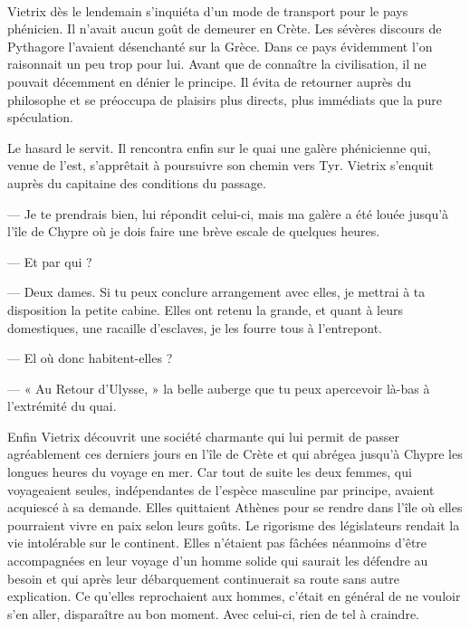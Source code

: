 \documentclass[a4paper, 11pt, oneside, polutonikogreek, french]{article}
\begin{document}
\paragraph{}
Vietrix dès le lendemain s'inquiéta d'un mode de transport pour le pays phénicien. Il n'avait aucun goût de demeurer en Crète. Les sévères discours de Pythagore l'avaient désenchanté sur la Grèce. Dans ce pays évidemment l'on raisonnait un peu trop pour lui. Avant que de connaître la civilisation, il ne pouvait décemment en dénier le principe. Il évita de retourner auprès du philosophe et se préoccupa de plaisirs plus directs, plus immédiats que la pure spéculation.

\bigskip
\centerline{\EightStarTaper}
\centerline{\EightStarTaper\EightStarTaper}
\bigskip

Le hasard le servit. Il rencontra enfin sur le quai une galère phénicienne qui, venue de l'est, s'apprêtait à poursuivre son chemin vers Tyr. Vietrix s'enquit auprès du capitaine des conditions du passage.

--- Je te prendrais bien, lui répondit celui-ci, mais ma galère a été louée jusqu'à l'île de Chypre où je dois faire une brève escale de quelques heures.

--- Et par qui ?

--- Deux dames. Si tu peux conclure arrangement avec elles, je mettrai à ta disposition la petite cabine. Elles ont retenu la grande, et quant à leurs domestiques, une racaille d'esclaves, je les fourre tous à l'entrepont.

--- El où donc habitent-elles ?

--- « Au Retour d'Ulysse, » la belle auberge que tu peux apercevoir là-bas à l'extrémité du quai.

Enfin Vietrix découvrit une société charmante qui lui permit de passer agréablement ces derniers jours en l'île de Crète et qui abrégea jusqu'à Chypre les longues heures du voyage en mer. Car tout de suite les deux femmes, qui voyageaient seules, indépendantes de l'espèce masculine par principe, avaient acquiescé à sa demande. Elles quittaient Athènes pour se rendre dans l'île où elles pourraient vivre en paix selon leurs goûts. Le rigorisme des législateurs rendait la vie intolérable sur le continent. Elles n'étaient pas fâchées néanmoins d'être accompagnées en leur voyage d'un homme solide qui saurait les défendre au besoin et qui après leur débarquement continuerait sa route sans autre explication. Ce qu'elles reprochaient aux hommes, c'était en général de ne vouloir s'en aller, disparaître au bon moment. Avec celui-ci, rien de tel à craindre.
\end{document}
